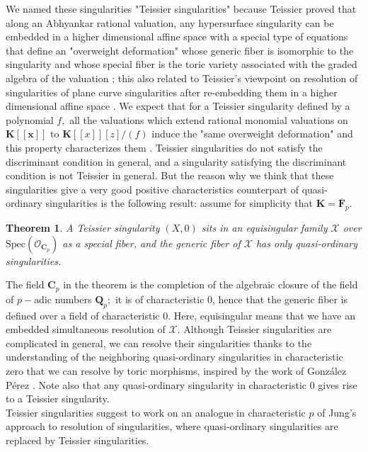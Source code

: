 \documentclass[11pt, a4paper]{amsart}
\numberwithin{equation}{section}
\theoremstyle{plain}
\newtheorem{Thm}{Theorem}[section]
\theoremstyle{definition}
\theoremstyle{remark}
\newcommand{\K}{\mathbf{K}}
\newcommand{\cO}{\mathcal{O}}
\newcommand{\cX}{\mathcal{X}}
\newcommand{\0}{{\boldsymbol 0}}
\newcommand{\x}{{\boldsymbol x}}
\begin{document}
\noindent We named these singularities "Teissier singularities" because Teissier proved that along an Abhyankar rational valuation, any hypersurface singularity can be embedded in a higher dimensional affine space with a special type of equations that define an "overweight deformation" whose generic fiber is isomorphic to the singularity and whose special fiber is the toric variety associated with the graded algebra of the valuation \cite{T}; this also related to Teissier's viewpoint on resolution of singularities of plane curve singularities after re-embedding them in a higher dimensional affine space \cite{TC}. We expect that for a Teissier singularity defined by a polynomial $f,$
all the valuations which extend rational monomial valuations on $\textbf{K}[[\x]]$ to $\textbf{K}[[x]][z]/(f)$ induce the  "same overweight deformation" and this property characterizes them \cite{CMT, CMT1}. Teissier singularities do not satisfy the discriminant condition in general, and a singularity satisfying the discriminant condition is not  Teissier  in general. But the reason why we think that these singularities give a very good positive characteristics counterpart of quasi-ordinary singularities is the following result: assume for simplicity that $\K=\overline{\mathbf{F}}_p.$\\
  
\begin{Thm}\label{main} A Teissier singularity $(X,0)$ sits in an equisingular  family $\cX$ over $ \mathrm{Spec}(\cO_{\textbf{C}_p}) $ as a special fiber, and the generic fiber of $\cX$ has only quasi-ordinary singularities.
\end{Thm}

The field $\textbf{C}_p$ in the theorem is the completion of the algebraic closure of the field of $p-$adic numbers $\mathbf{Q}_p;$ it is of characteristic $0$, hence that the generic fiber is defined over a field of characteristic $0.$ Here, equisingular means that we have an embedded simultaneous resolution of $\cX.$ Although Teissier singularities are complicated in general, we can resolve their singularities thanks to the understanding of the neighboring quasi-ordinary singularities in characteristic zero that we can resolve by toric morphisms, inspired by the work of Gonz\'alez P\'erez \cite{Pedro}. Note also that any quasi-ordinary singularity in characteristic $0$ gives rise to a Teissier singularity.\\
Teissier singularities suggest to work on an analogue in characteristic $p$ of Jung's approach to resolution of singularities, where quasi-ordinary singularities are replaced by Teissier singularities. \\
\end{document}
